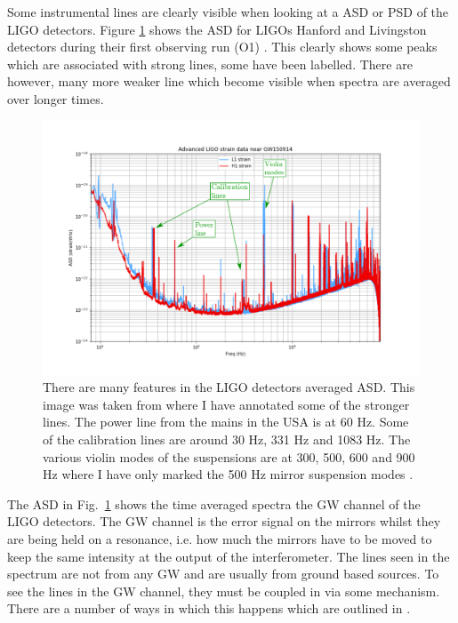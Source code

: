 Some instrumental lines are clearly visible when looking at a \gls{ASD} or \gls{PSD} of the \gls{LIGO} detectors. Figure \ref{detchar:line:psd} shows the \gls{ASD} for \glspl{LIGO} Hanford and Livingston detectors during their first observing run (O1) \citep{GWOpen}. This clearly shows some peaks which are associated with strong lines, some have been labelled. There are however, many more weaker line which become visible when spectra are averaged over longer times.
%
\begin{figure}
    \centering
    \includegraphics[width=\textwidth]{C5_detchar/ligo_o1_asd_annot.pdf}
    \caption[Strain \gls{ASD} for the \gls{LIGO} detectors.]{There are many features in the \gls{LIGO} detectors averaged \gls{ASD}. This image was taken from \citep{GWOpen} where I have annotated some of the stronger lines. The power line from the mains in the USA is at 60 Hz. Some of the calibration lines are around 30 Hz, 331 Hz and 1083 Hz. The various violin modes of the suspensions are at 300, 500, 600 and 900 Hz where I have only marked the 500 Hz mirror suspension modes \citep{GWOpen}.}
    \label{detchar:line:psd}
\end{figure}
%
The \gls{ASD} in Fig.~\ref{detchar:line:psd} shows the time averaged spectra the \gls{GW} channel of the \gls{LIGO} detectors. 
The \gls{GW} channel is the error signal on the mirrors whilst they are being held on a resonance, i.e. how much the mirrors have to be moved to keep the same intensity at the output of the interferometer.
The lines seen in the spectrum are not from any \gls{GW} and are usually from ground based sources.
To see the lines in the \gls{GW} channel, they must be coupled in via some mechanism. 
There are a number of ways in which this happens which are outlined in \citep{covas2018IdentificationMitigation}.
